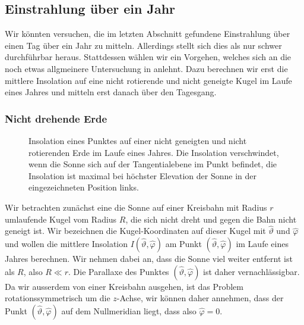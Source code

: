 %
%
%
\subsection{Einstrahlung über ein Jahr}
Wir könnten versuchen, die im letzten Abschnitt gefundene Einstrahlung
über einen Tag über ein Jahr zu mitteln.
Allerdings stellt sich dies als nur schwer durchführbar heraus.
Stattdessen wählen wir ein Vorgehen, welches  sich an die 
noch etwas allgmeinere Untersuchung in 
\cite[section 5]{skript:mcgeheelehman}
anlehnt.
Dazu berechnen wir erst die mittlere Insolation auf eine nicht
rotierende und nicht geneigte Kugel im Laufe eines Jahres und
mitteln erst danach über den Tagesgang.

\subsubsection{Nicht drehende Erde}
\begin{figure}%
\centering%
\caption{Insolation eines Punktes auf einer nicht geneigten 
und nicht rotierenden Erde im Laufe eines Jahres.
Die Insolation verschwindet, wenn die Sonne sich auf der Tangentialebene
im Punkt befindet, die Insolation ist maximal bei höchster Elevation
der Sonne in der eingezeichneten Position links.
\label{skript:insolation:fest}}
\end{figure}%
Wir betrachten zunächst eine die Sonne auf einer Kreisbahn mit Radius $r$
umlaufende Kugel vom Radius $R$, die sich nicht dreht und gegen die Bahn
nicht geneigt ist.
Wir bezeichnen die Kugel-Koordinaten auf dieser Kugel mit $\hat\vartheta$
und $\hat\varphi$ und wollen die mittlere Insolation
$I(\hat\vartheta,\hat\varphi)$ am Punkt $(\hat\vartheta,\hat\varphi)$
im Laufe eines Jahres berechnen.
Wir nehmen dabei an, dass die Sonne viel weiter entfernt ist als $R$,
also $R\ll r$.
Die Parallaxe des Punktes $(\hat\vartheta,\hat\varphi)$ ist daher
vernachlässigbar.
Da wir ausserdem von einer Kreisbahn ausgehen, ist das Problem
rotationssymmetrisch um die $z$-Achse, wir können daher annehmen, dass
der Punkt $(\hat\vartheta,\hat\varphi)$ auf dem Nullmeridian liegt,
dass also $\hat\varphi=0$.

